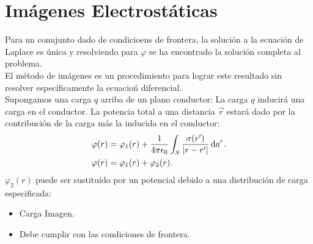 \section{Imágenes Electrostáticas}
Para un conujunto dado de condicioens de frontera, la solución a la ecuación de Laplace es única y resolviendo para $\varphi$ se ha encontrado la solución completa al problema. \\
El método de imágenes es un procedimiento para lograr este resultado sin resolver específicamente la ecuacioń diferencial.  \\

Supongamos una carga $q$ arriba de un plano conductor: La carga $q$ inducirá una carga en el conductor. La potencia total a una distancia $\vec{r}$ estará dado por la contribución de la carga más la inducida en el conductor:
\begin{align*}
	\varphi (r) &= \varphi _1 (r) + \frac{1}{4\pi \epsilon_0} \int _S \frac{\sigma (r')}{\abs{r - r'}} \dd{a'}. \\
	\varphi (r) &= \varphi _1 (r) + \varphi _2 (r).
\end{align*}
$\varphi _2 (r)$ puede ser sustituído por un potencial debido a una distribución de carga especificada: 
\begin{itemize}
	\item Carga Imagen.
	\item Debe cumplir con las condiciones de frontera.
\end{itemize}


